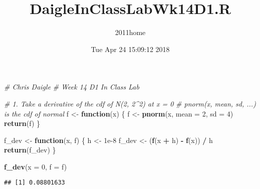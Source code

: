 \documentclass[]{article}
\title{DaigleInClassLabWk14D1.R}
\author{2011home}
\date{Tue Apr 24 15:09:12 2018}
\newenvironment{Shaded}{\begin{snugshade}}{\end{snugshade}}
\newcommand{\KeywordTok}[1]{\textcolor[rgb]{0.13,0.29,0.53}{\textbf{#1}}}
\newcommand{\DataTypeTok}[1]{\textcolor[rgb]{0.13,0.29,0.53}{#1}}
\newcommand{\DecValTok}[1]{\textcolor[rgb]{0.00,0.00,0.81}{#1}}
\newcommand{\FloatTok}[1]{\textcolor[rgb]{0.00,0.00,0.81}{#1}}
\newcommand{\StringTok}[1]{\textcolor[rgb]{0.31,0.60,0.02}{#1}}
\newcommand{\CommentTok}[1]{\textcolor[rgb]{0.56,0.35,0.01}{\textit{#1}}}
\newcommand{\ControlFlowTok}[1]{\textcolor[rgb]{0.13,0.29,0.53}{\textbf{#1}}}
\newcommand{\OperatorTok}[1]{\textcolor[rgb]{0.81,0.36,0.00}{\textbf{#1}}}
\newcommand{\NormalTok}[1]{#1}
\begin{document}
\maketitle

\begin{Shaded}
\begin{Highlighting}[]
\CommentTok{# Chris Daigle}
\CommentTok{# Week 14 D1 In Class Lab}

\CommentTok{# 1. Take a derivative of the cdf of N(2, 2^2) at x = 0}
\CommentTok{# pnorm(x, mean, sd, ...) is the cdf of normal}
\NormalTok{f <-}\StringTok{ }\ControlFlowTok{function}\NormalTok{(x) \{}
\NormalTok{  f <-}\StringTok{ }\KeywordTok{pnorm}\NormalTok{(x, }\DataTypeTok{mean =} \DecValTok{2}\NormalTok{, }\DataTypeTok{sd =} \DecValTok{4}\NormalTok{)}
  \KeywordTok{return}\NormalTok{(f)}
\NormalTok{\}}

\NormalTok{f_dev <-}\StringTok{ }\ControlFlowTok{function}\NormalTok{(x, f) \{}
\NormalTok{  h <-}\StringTok{ }\FloatTok{1e-8}
\NormalTok{  f_dev <-}\StringTok{ }\NormalTok{(}\KeywordTok{f}\NormalTok{(x }\OperatorTok{+}\StringTok{ }\NormalTok{h) }\OperatorTok{-}\StringTok{ }\KeywordTok{f}\NormalTok{(x)) }\OperatorTok{/}\StringTok{ }\NormalTok{h}
  \KeywordTok{return}\NormalTok{(f_dev)}
\NormalTok{\}}

\KeywordTok{f_dev}\NormalTok{(}\DataTypeTok{x =} \DecValTok{0}\NormalTok{, }\DataTypeTok{f =}\NormalTok{ f)}
\end{Highlighting}
\end{Shaded}

\begin{verbatim}
## [1] 0.08801633
\end{verbatim}
\end{document}
